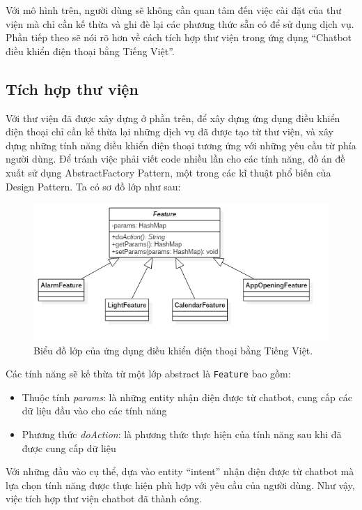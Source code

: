 \documentclass[12pt]{report}
\begin{document}
Với mô hình trên, người dùng sẽ không cần quan tâm đến việc cài đặt của thư viện mà chỉ cần kế thừa và ghi đè lại các phương thức sẵn có để sử dụng dịch vụ. Phần tiếp theo sẽ nói rõ hơn về cách tích hợp thư viện trong ứng dụng ``Chatbot điều khiển điện thoại bằng Tiếng Việt''.

\subsection{Tích hợp thư viện}

Với thư viện đã được xây dựng ở phần trên, để xây dựng ứng dụng điều khiển điện thoại chỉ cần kế thừa lại những dịch vụ đã được tạo từ thư viện, và xây dựng những tính năng điều khiển điện thoại tương ứng với những yêu cầu từ phía người dùng. Để tránh việc phải viết code nhiều lần cho các tính năng, đồ án đề xuất sử dụng AbstractFactory Pattern, một trong các kĩ thuật phổ biến của Design Pattern. Ta có sơ đồ lớp như sau:

\begin{figure}[H]
	\centering
	\includegraphics[width=15cm]{Pics/Chap6/app-model.png}
	\caption{Biểu đồ lớp của ứng dụng điều khiển điện thoại bằng Tiếng Việt.}
	\label{fig:app-model}
\end{figure}

Các tính năng sẽ kế thừa từ một lớp abstract là \texttt{Feature} bao gồm:
\begin{itemize}
	\item Thuộc tính \textit{params}: là những entity nhận diện được từ chatbot, cung cấp các dữ liệu đầu vào cho các tính năng
	\item Phương thức \textit{doAction}: là phương thức thực hiện của tính năng sau khi đã được cung cấp dữ liệu
\end{itemize}

Với những đầu vào cụ thể, dựa vào entity ``intent'' nhận diện được từ chatbot mà lựa chọn tính năng được thực hiện phù hợp với yêu cầu của người dùng. Như vậy, việc tích hợp thư viện chatbot đã thành công.
\end{document}

